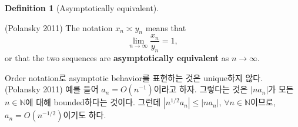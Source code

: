\documentclass[
  letterpaper,
  DIV=11,
  numbers=noendperiod]{scrreprt}
\theoremstyle{definition}
\theoremstyle{plain}
\theoremstyle{plain}
\theoremstyle{definition}
\theoremstyle{plain}
\theoremstyle{definition}
\newtheorem{definition}{Definition}[chapter]
\theoremstyle{remark}
\begin{document}
\begin{definition}[Asymptotically
equivalent]\protect\hypertarget{def-asymptequiv}{}\label{def-asymptequiv}

(Polansky 2011) The notation \(x_n \asymp y_n\) means that \[
\lim_{n\rightarrow\infty} \frac{x_n}{y_n}=1,
\] or that the two sequences are \textbf{asymptotically equivalent} as
\(n\rightarrow\infty\).

\end{definition}

\begin{tcolorbox}[enhanced jigsaw, left=2mm, arc=.35mm, leftrule=.75mm, colback=white, title=\textcolor{quarto-callout-tip-color}{\faLightbulb}\hspace{0.5em}{Remark}, rightrule=.15mm, breakable, bottomrule=.15mm, coltitle=black, opacitybacktitle=0.6, opacityback=0, toptitle=1mm, titlerule=0mm, toprule=.15mm, colbacktitle=quarto-callout-tip-color!10!white, bottomtitle=1mm, colframe=quarto-callout-tip-color-frame]

Order notation로 asymptotic behavior를 표현하는 것은 unique하지 않다.
(Polansky 2011) 예를 들어 \(a_n = O(n^{-1})\)이라고 하자. 그렇다는 것은
\(\vert n a_n \vert\)가 모든 \(n\in \mathbb{N}\)에 대해 bounded하다는
것이다. 그런데 \(|n^{1/2}a_n| \leq |na_n|\),
\(\forall n\in\mathbb{N}\)이므로, \(a_n = O(n^{-1/2})\)이기도 하다.

\end{tcolorbox}
\end{document}
